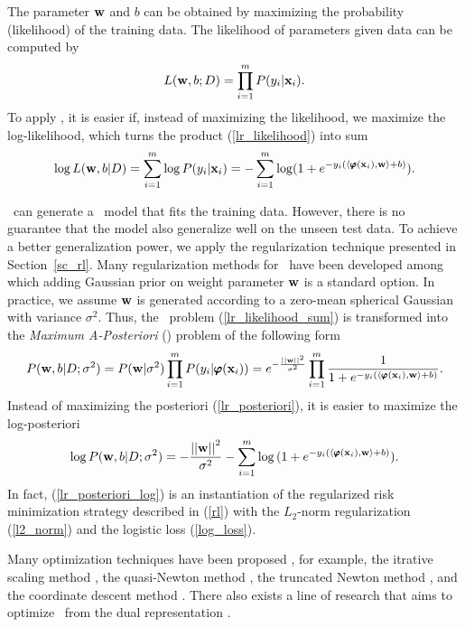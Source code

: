 {%
The parameter $\mathbf {w}$ and $b$ can be obtained by maximizing the probability (likelihood) of the training data.
The likelihood of parameters given data can be computed by
\begin{align}
	L(\mathbf {w},b;D) = \prod_{i=1}^mP(y_i|\mathbf {x}_i). \label{lr_likelihood}
\end{align}
To apply \mle, it is easier if, instead of maximizing the likelihood, we maximize the log-likelihood, which turns the product (\ref{lr_likelihood}) into sum
\begin{align}
	\log L(\mathbf {w},b|D) = \sum_{i=1}^{m}\log P(y_i|\mathbf {x}_i) = -\sum_{i=1}^{m}\log (1+e^{ -y_i(\langle \pmb \varphi(\mathbf {x}_i), \mathbf {w} \rangle+b) }) \label{lr_likelihood_sum}.
\end{align}

\mle\ can generate a \lr\ model that fits the training data.
However, there is no guarantee that the model also generalize well on the unseen test data.
To achieve a better generalization power, we apply the regularization technique presented in Section~\ref{sc_rl}.
Many regularization methods for \lr\ have been developed \citep{Chen99,Chen00,Goodman03} among which adding Gaussian prior on weight parameter $\mathbf {w}$ is a standard option.
In practice, we assume $\mathbf {w}$ is generated according to a zero-mean spherical Gaussian with variance $\sigma^2$.
Thus, the \mle\ problem (\ref{lr_likelihood_sum}) is transformed into the \textit{Maximum A-Posteriori} (\map) problem of the following form
\begin{align}
	P(\mathbf {w},b|D;\sigma^2) = P(\mathbf {w}|\sigma^2)\prod_{i=1}^mP(y_i|\pmb \varphi(\mathbf {x}_i))=e^{ -\frac{\left|\left| \mathbf {w} \right|\right|^2}{\sigma^2} }\prod_{i=1}^{m}{\frac{1}{1+e^{ -y_i(\langle \pmb \varphi(\mathbf {x}_i), \mathbf {w} \rangle+b) }}}. \label{lr_posteriori}
\end{align}
Instead of maximizing the posteriori (\ref{lr_posteriori}), it is easier to maximize the log-posteriori
\begin{align}
	\log P(\mathbf {w},b|D;\sigma^2) = -{\frac{\left|\left| \mathbf {w} \right|\right|^2}{\sigma^2}} - \sum_{i=1}^{m}\log{(1+e^{ -y_i(\langle \pmb \varphi(\mathbf {x}_i), \mathbf {w}\rangle+b) })}. \label{lr_posteriori_log}
\end{align}
In fact, (\ref{lr_posteriori_log}) is an instantiation of the regularized risk minimization strategy described in (\ref{rl}) with the $L_2$-norm regularization (\ref{l2_norm}) and the logistic loss (\ref{log_loss}).

Many optimization techniques have been proposed \citep{Minka03}, for example, 
the {itrative scaling} method \citep{Darroch72,Pietra97inducing,Berger97,Goodman02Sequential,Jin03a},
the quasi-Newton method \citep{Minka03},
the truncated Newton method \citep{Komarek05making,Lin2008trust},
and the coordinate descent method \citep{Huang09iterative}.
There also exists a line of research that aims to optimize \lr\ from the dual representation \citep{Jaakkola99probabilistic,Keerthi05a,Yu11dual}.




}
